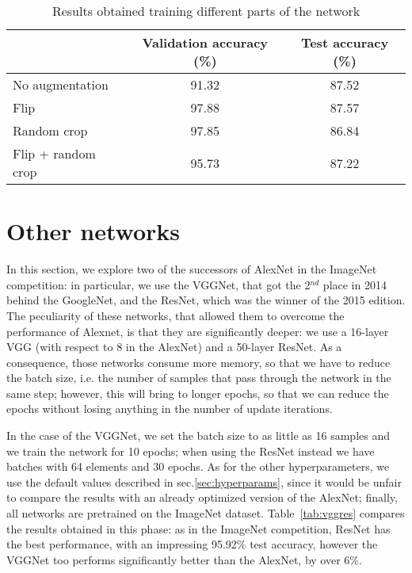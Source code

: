 \documentclass[11pt,twoside,a4paper]{article}
\begin{document}
\begin{table}[!h]
  \begin{adjustwidth}{-.5in}{-.5in}
  \begin{center}
    \begin{tabular}{l | c | c}
       & Validation accuracy (\%) & Test accuracy (\%) \\
      \hline
	No augmentation & 91.32 & 87.52\\
	Flip & 97.88 & 87.57\\
	Random crop & 97.85 & 86.84\\
	Flip + random crop & 95.73 & 87.22\\
    \end{tabular}
    \caption{Results obtained training different parts of the network}
    \label{tab:freeze}
  \end{center}
  \end{adjustwidth}
\end{table}

\section{Other networks}
In this section, we explore two of the successors of AlexNet in the ImageNet competition: in particular, we use the VGGNet, that got the 2$^{nd}$ place in 2014 behind the GoogleNet, and the ResNet, which was the winner of the 2015 edition.\newline
The peculiarity of these networks, that allowed them to overcome the performance of Alexnet, is that they are significantly deeper: we use a 16-layer VGG (with respect to 8 in the AlexNet) and a 50-layer ResNet. As a consequence, those networks consume more memory, so that we have to reduce the batch size, i.e. the number of samples that pass through the network in the same step; however, this will bring to longer epochs, so that we can reduce the epochs without losing anything in the number of update iterations.

In the case of the VGGNet, we set the batch size to as little as 16 samples and we train the network for 10 epochs; when using the ResNet instead we have batches with 64 elements and 30 epochs. As for the other hyperparameters, we use the default values described in sec.\ref{sec:hyperparams}, since it would be unfair to compare the results with an already optimized version of the AlexNet; finally, all networks are pretrained on the ImageNet dataset.\newline
Table~\ref{tab:vggres} compares the results obtained in this phase: as in the ImageNet competition, ResNet has the best performance, with an impressing 95.92\% test accuracy, however the VGGNet too performs significantly better than the AlexNet, by over 6\%.
\end{document}
